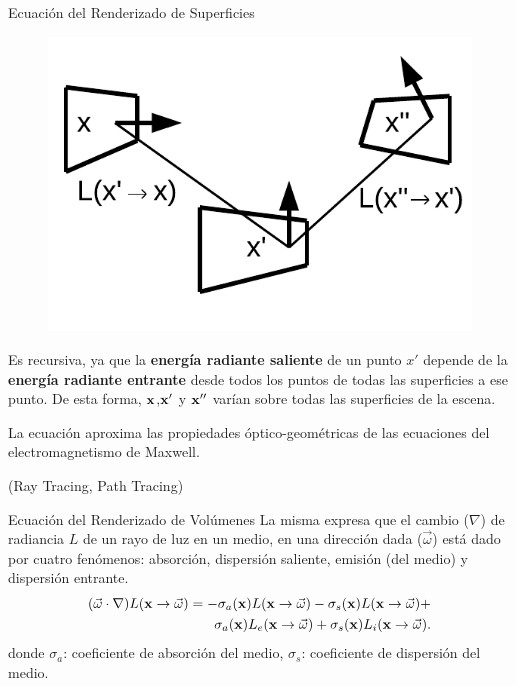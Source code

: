 \documentclass[spanish]{beamer}
\begin{document}
\begin{frame}{Ecuación del Renderizado de Superficies}
\begin{figure}
\includegraphics[scale = 0.6]{../figures/rendequation}
\end{figure}

Es recursiva, ya que la \textbf{energía radiante saliente} de un punto $x'$ depende de la \textbf{energía radiante entrante} desde todos los puntos de todas las superficies a ese punto.
De esta forma, $\bold{x}$,$\bold{x'}$ y $\bold{x''}$ varían sobre todas las superficies de la escena.

La ecuación aproxima las propiedades óptico-geométricas de las ecuaciones del electromagnetismo de Maxwell.

(Ray Tracing, Path Tracing)
\end{frame}


\begin{frame}{Ecuación del Renderizado de Volúmenes}
La misma expresa que el cambio ($\nabla$) de radiancia $L$ de un rayo de luz en un medio, en una dirección dada ($\vec{\omega}$) está dado por cuatro fenómenos: absorción, dispersión saliente, emisión (del medio) y dispersión entrante.
\begin{equation*}
\begin{aligned}
(\vec{\omega} \cdot \nabla) L(\bold{x} \rightarrow \vec{\omega}) = - \sigma_{a}(\bold{x}) L(\bold{x} \rightarrow \vec{\omega}) - \sigma_{s}(\bold{x}) L(\bold{x} \rightarrow \vec{\omega}) + \\
\sigma_{a}(\bold{x}) L_{e}(\bold{x} \rightarrow \vec{\omega}) + \sigma_{s}(\bold{x}) L_{i}(\bold{x} \rightarrow \vec{\omega}).
\end{aligned}
\end{equation*}
donde $\sigma_{a}$: coeficiente de absorción del medio, $\sigma_{s}$: coeficiente de dispersión del medio.

\end{frame}
\end{document}
